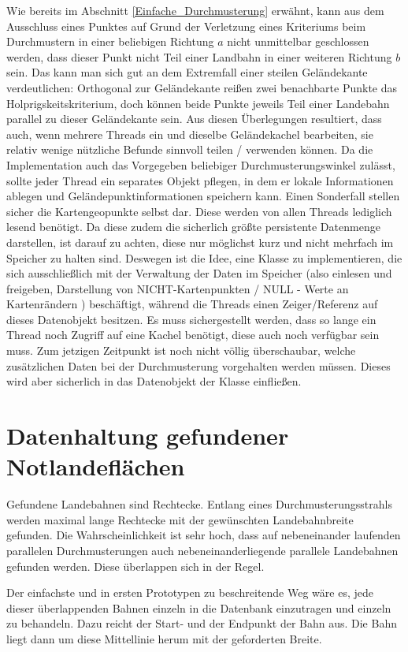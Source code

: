\documentclass[
11pt, %
a4paper, %
oneside, %
pdfspacing, %
headinclude,
BCOR5mm, %
ngerman, %
bibtotocnumbered,
]{scrartcl}
\begin{document}
Wie bereits im Abschnitt \ref{Einfache_Durchmusterung} erwähnt, kann aus dem Ausschluss eines Punktes auf Grund der Verletzung eines Kriteriums beim Durchmustern in einer beliebigen Richtung $a$ nicht unmittelbar geschlossen werden, dass dieser Punkt nicht Teil einer Landbahn in einer weiteren Richtung $b$ sein. Das kann man sich gut an dem Extremfall einer steilen Geländekante verdeutlichen: Orthogonal zur Geländekante reißen zwei benachbarte Punkte das Holprigskeitskriterium, doch können beide Punkte jeweils Teil einer Landebahn parallel zu dieser Geländekante sein.
Aus diesen Überlegungen resultiert, dass auch, wenn mehrere Threads ein und dieselbe Geländekachel bearbeiten, sie relativ wenige nützliche Befunde sinnvoll teilen / verwenden können. Da die Implementation auch das Vorgegeben beliebiger Durchmusterungswinkel zulässt, sollte jeder Thread ein separates Objekt pflegen, in dem er lokale Informationen ablegen und Geländepunktinformationen speichern kann. 
Einen Sonderfall stellen sicher die Kartengeopunkte selbst dar. Diese werden von allen Threads lediglich lesend benötigt. Da diese zudem die sicherlich größte persistente Datenmenge darstellen, ist darauf zu achten, diese nur möglichst kurz und nicht mehrfach im Speicher zu halten sind. Deswegen ist die Idee, eine Klasse zu implementieren, die sich ausschließlich mit der Verwaltung der Daten im Speicher (also einlesen und freigeben, Darstellung von NICHT-Kartenpunkten / NULL - Werte an Kartenrändern ) beschäftigt, während die Threads einen Zeiger/Referenz auf dieses Datenobjekt besitzen. Es muss sichergestellt werden, dass so lange ein Thread noch Zugriff auf eine Kachel benötigt, diese auch noch verfügbar sein muss. Zum jetzigen Zeitpunkt ist noch nicht völlig überschaubar, welche zusätzlichen Daten bei der Durchmusterung vorgehalten werden müssen. Dieses wird aber sicherlich in das Datenobjekt der Klasse einfließen.

\section{Datenhaltung gefundener Notlandeflächen}

Gefundene Landebahnen sind Rechtecke. Entlang eines Durchmusterungsstrahls werden maximal lange Rechtecke mit der gewünschten Landebahnbreite gefunden. Die Wahrscheinlichkeit ist sehr hoch, dass auf nebeneinander laufenden parallelen Durchmusterungen auch nebeneinanderliegende parallele Landebahnen gefunden werden. Diese überlappen sich in der Regel. 

Der einfachste und in ersten Prototypen zu beschreitende Weg wäre es, jede dieser überlappenden Bahnen einzeln in die Datenbank einzutragen und einzeln zu behandeln. Dazu reicht der Start- und der Endpunkt der Bahn aus. Die Bahn liegt dann um diese Mittellinie herum mit der geforderten Breite.
\end{document}
